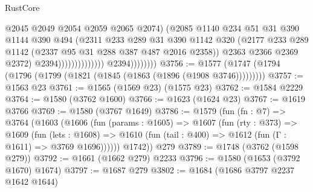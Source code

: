 \begin{lexlean}{RustCore}
\begin{coremodule}
                                                @2045
                                                @2049
                                                @2054
                                                @2059
                                                @2065
                                                @2074)
                                              (@2085
                                                @1140
                                                @234
                                                @51
                                                @31
                                                @390
                                                @1144
                                                @390
                                                @494
                                                (@2311
                                                  @233
                                                  @289
                                                  @31
                                                  @390
                                                  @1142
                                                  @320
                                                  (@2177
                                                    @233
                                                    @289
                                                    @1142
                                                    (@2337 @95 @31 @288 @387 @487 @2016 @2358))
                                                  @2363
                                                  @2366
                                                  @2369
                                                  @2372)
                                                @2394))))))))))))))
                    @2394))))))))
@3756 := @1577 (@1747 (@1794 (@1796 (@1799 (@1821 (@1845 (@1863 (@1896 (@1908 @3746)))))))))
@3757 := @1563 @23
@3761 := @1565 (@1569 @23) (@1575 @23)
@3762 := @1584 @2229
@3764 := @1580 (@3762 @1600)
@3766 := @1623 (@1624 @23)
@3767 := @1619 @3766
@3769 := @1580 (@3767 @1649)
@3786 := @1579
    (fun (fn : @7) =>
    @3764
      (@1603
        (@1606
          (fun (params : @1605) =>
          @1607
            (fun (rty : @373) =>
            @1609
              (fun (lets : @1608) =>
              @1610 (fun (tail : @400) => @1612 (fun (Γ : @1611) => @3769 @1696))))))
        @1742))
    @279
@3789 := @1748 (@3762 (@1598 @279))
@3792 := @1661 (@1662 @279) @2233
@3796 := @1580 (@1653 (@3792 @1670) @1674)
@3797 := @1687 @279
@3802 := @1684 (@1686 @3797 @2237 @1642 @1644)

\end{coremodule}
\end{lexlean}
